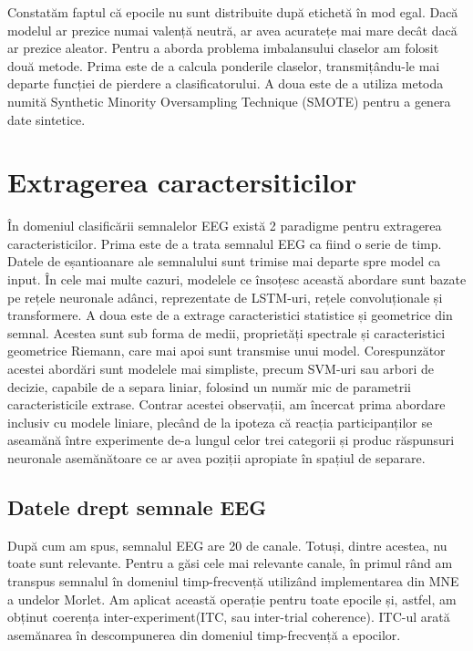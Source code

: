 Constatăm faptul că epocile nu sunt distribuite după etichetă în mod egal. Dacă modelul ar prezice numai valență neutră, ar avea acuratețe mai mare decât dacă ar prezice aleator. Pentru a aborda problema imbalansului claselor am folosit două metode. Prima este de a calcula ponderile claselor, transmițându-le mai departe funcției de pierdere a clasificatorului. A doua este de a utiliza metoda numită Synthetic Minority Oversampling Technique (SMOTE)\cite{imblearn} pentru a genera date sintetice.

\section{Extragerea caractersiticilor}
În domeniul clasificării semnalelor EEG există 2 paradigme pentru extragerea caracteristicilor. Prima este de a trata semnalul EEG ca fiind o serie de timp. Datele de eșantioanare ale semnalului sunt trimise mai departe spre model ca input. În cele mai multe cazuri, modelele ce însoțesc această abordare sunt bazate pe rețele neuronale adânci, reprezentate de LSTM-uri, rețele convoluționale și transformere. A doua este de a extrage caracteristici statistice și geometrice din semnal. Acestea sunt sub forma de medii, proprietăți spectrale și caracteristici geometrice Riemann, care mai apoi sunt transmise unui model. Corespunzător acestei abordări sunt modelele mai simpliste, precum SVM-uri sau arbori de decizie, capabile de a separa liniar, folosind un număr mic de parametrii caracteristicile extrase. Contrar acestei observații, am încercat prima abordare inclusiv cu modele liniare, plecând de la ipoteza că reacția participanților se aseamănă între experimente de-a lungul celor trei categorii și produc răspunsuri neuronale asemănătoare ce ar avea poziții apropiate în spațiul de separare.


\subsection{Datele drept semnale EEG}
După cum am spus, semnalul EEG are 20 de canale. Totuși, dintre acestea, nu toate sunt relevante. Pentru a găsi cele mai relevante canale, în primul rând am transpus semnalul în domeniul timp-frecvență utilizând implementarea din MNE\cite{MNE} a undelor Morlet. Am aplicat această operație pentru toate epocile și, astfel, am obținut coerența inter-experiment(ITC, sau inter-trial coherence). ITC-ul arată asemănarea în descompunerea din domeniul timp-frecvență a epocilor.

